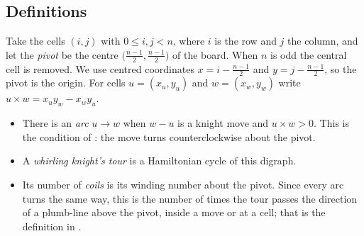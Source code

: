\documentclass[11pt]{amsart}
\theoremstyle{remark}
\begin{document}
\subsection*{Definitions}
Take the cells $(i,j)$ with $0\le i,j<n$, where $i$ is the row and $j$ the column, and let the \emph{pivot} be the centre $\bigl(\tfrac{n-1}2,\tfrac{n-1}2\bigr)$
of the board. When $n$ is odd the central cell is removed. We use centred coordinates
$x=i-\tfrac{n-1}2$ and $y=j-\tfrac{n-1}2$, so the pivot is the origin. For cells $u=(x_u,y_u)$ and $w=(x_w,y_w)$
write $u\times w=x_uy_w-x_wy_u$.
\begin{itemize}
\item There is an \emph{arc} $u\to w$ when $w-u$ is a knight move and $u\times w>0$. This is the condition of
\cite[answer 227]{knuth}: the move turns counterclockwise about the pivot.
\item A \emph{whirling knight's tour} is a Hamiltonian cycle of this digraph.
\item Its number of \emph{coils} is its winding number about the pivot. Since every arc turns the same way, this is
the number of times the tour passes the direction of a plumb-line above the pivot, inside a move or at a cell; that
is the definition in \cite[exercise 229]{knuth}.
\end{itemize}
\end{document}
